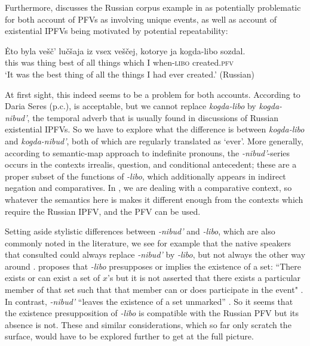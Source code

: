 \documentclass[output=paper,colorlinks,citecolor=brown]{langscibook}
\begin{document}
Furthermore, \citet[][25]{klimek22} discusses the Russian corpus example in  as potentially problematic for both  account of PFVs as involving unique events, as well as  account of existential IPFVs being motivated by potential repeatability: 

\ea\label{ex:libo}
\gll Ėto byla vešč' lučšaja iz vsex veščej, kotorye ja kogda-libo sozdal.\\
this was thing best of all things which I when-\textsc{libo} created.\textsc{pfv}\\
\glt `It was the best thing of all the things I had ever created.' \hfill (Russian)
\z 

\noindent At first sight, this indeed seems to be a problem for both accounts. According to Daria Seres (p.c.),  is acceptable, but we cannot replace \textit{kogda-libo} by \textit{kogda-nibud'}, the temporal adverb that is usually found in discussions of Russian existential IPFVs. So we have to explore what the difference is between \textit{kogda-libo} and \textit{kogda-nibud'}, both of which are regularly translated as `ever'. More generally, according to  semantic-map approach to indefinite pronouns, the \textit{-nibud'}-series occurs in the contexts irrealis, question, and conditional antecedent; these are a proper subset of the functions of \textit{-libo}, which additionally appears in indirect negation and comparatives. In , we are dealing with a comparative context, so whatever the semantics here is makes it different enough from the contexts which require the Russian IPFV, and the PFV can be used. 

Setting aside stylistic differences between \textit{-nibud'} and \textit{-libo}, which are also commonly noted in the literature, we see for example that the native speakers that \citet{ward77} consulted could always replace \textit{-nibud'} by \textit{-libo}, but not always the other way around%
. \citeauthor{ward77} proposes that \textit{-libo} presupposes or implies the existence of a set: ``There exists or can exist a set of $x$'s but it is not asserted that there exists a particular member of that set such that that member can or does participate in the event" \citep[][465]{ward77}. In contrast, \textit{-nibud'} ``leaves the existence of a set unmarked'' \citep[][467]{ward77}. So it seems that the existence presupposition of \textit{-libo} is compatible with the Russian PFV but its absence is not. These and similar considerations, which so far only scratch the surface, would have to be explored further to get at the full picture.
 
\end{document}
